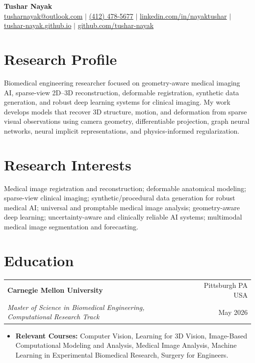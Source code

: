 \documentclass[letterpaper,10pt]{article}
\newcommand{\cvItem}[1]{\item\small{#1}}
\newcommand{\cvSubheading}[4]{
  \vspace{1pt}
  \begin{tabularx}{\textwidth}{X r}
    \textbf{#1} & #2 \\
    \textit{\small #3} & \small #4 \\
  \end{tabularx}
  \vspace{-2pt}
}
\newcommand{\cvItemListStart}{
  \begin{itemize}[leftmargin=0.16in, itemsep=1.5pt, parsep=0pt, topsep=2pt]
}
\newcommand{\cvItemListEnd}{
  \end{itemize}
  \vspace{2pt}
}
\begin{document}
\begin{center}
    {\Huge \textbf{Tushar Nayak}} \\ \vspace{2pt}
    \small
    \href{mailto:tusharnayak@outlook.com}{tusharnayak@outlook.com} $|$
    \href{tel:+14124785677}{(412) 478-5677} $|$
    \href{https://linkedin.com/in/nayaktushar}{linkedin.com/in/nayaktushar} $|$
    \href{https://tushar-nayak.github.io}{tushar-nayak.github.io} $|$
    \href{https://github.com/tushar-nayak}{github.com/tushar-nayak}
\end{center}

\vspace{-4pt}

\section{Research Profile}
\small{
Biomedical engineering researcher focused on geometry-aware medical imaging AI, sparse-view 2D--3D reconstruction, deformable registration, synthetic data generation, and robust deep learning systems for clinical imaging. My work develops models that recover 3D structure, motion, and deformation from sparse visual observations using camera geometry, differentiable projection, graph neural networks, neural implicit representations, and physics-informed regularization.
}

\section{Research Interests}
\small{
Medical image registration and reconstruction; deformable anatomical modeling; sparse-view clinical imaging; synthetic/procedural data generation for robust medical AI; universal and promptable medical image analysis; geometry-aware deep learning; uncertainty-aware and clinically reliable AI systems; multimodal medical image segmentation and forecasting.
}

\section{Education}

\cvSubheading
  {Carnegie Mellon University}{Pittsburgh PA \textsc{USA}}
  {Master of Science in Biomedical Engineering, Computational Research Track}{May 2026}
\cvItemListStart
  \cvItem{\textbf{Relevant Courses:} Computer Vision, Learning for 3D Vision, Image-Based Computational Modeling and Analysis, Medical Image Analysis, Machine Learning in Experimental Biomedical Research, Surgery for Engineers.}
\cvItemListEnd
\end{document}
